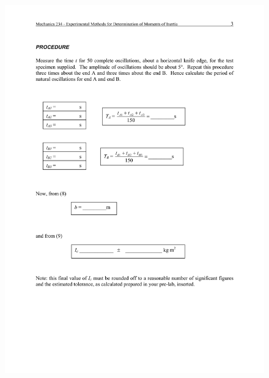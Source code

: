 \documentclass[12pt,a4paper]{report}
\begin{document}
\begin{figure}
 \includegraphics[width=\linewidth]{lab1/lab1-3}
  \caption*{}
\label{}
\end{figure}
\end{document}
